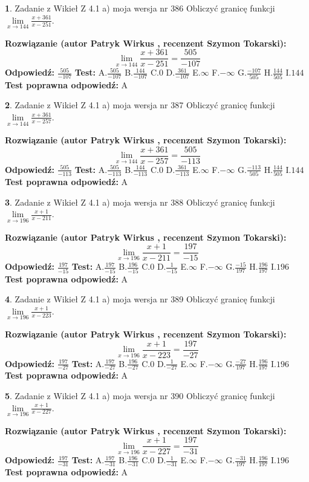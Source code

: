 \documentclass[12pt, a4paper]{article}
\theoremstyle{definition} %
\newtheorem{zad}{}
\newcommand{\zadStart}[1]{\begin{zad}#1\newline}
\newcommand{\zadStop}{\end{zad}}
\newcommand{\rozwStart}[2]{\noindent \textbf{Rozwiązanie (autor #1 , recenzent #2): }\newline}
\newcommand{\rozwStop}{\newline}
\newcommand{\odpStart}{\noindent \textbf{Odpowiedź:}\newline}
\newcommand{\odpStop}{\newline}
\newcommand{\testStart}{\noindent \textbf{Test:}\newline}
\newcommand{\testStop}{\newline}
\newcommand{\kluczStart}{\noindent \textbf{Test poprawna odpowiedź:}\newline}
\newcommand{\kluczStop}{\newline}
\begin{document}
\zadStart{Zadanie z Wikieł Z 4.1 a) moja wersja nr 386}
Obliczyć granicę funkcji $\lim\limits_{x\to144}\frac{x+361}{x-251}$.
\zadStop
\rozwStart{Patryk Wirkus}{Szymon Tokarski}
$$\lim\limits_{x\to144}\frac{x+361}{x-251} = \frac{505}{-107}$$
\rozwStop
\odpStart
$\frac{505}{-107}$
\odpStop
\testStart
A.$\frac{505}{-107}$
B.$\frac{144}{-107}$
C.$0$
D.$\frac{361}{-107}$
E.$\infty$
F.$-\infty$
G.$\frac{-107}{505}$
H.$\frac{144}{505}$
I.$144$
\testStop
\kluczStart
A
\kluczStop



\zadStart{Zadanie z Wikieł Z 4.1 a) moja wersja nr 387}
Obliczyć granicę funkcji $\lim\limits_{x\to144}\frac{x+361}{x-257}$.
\zadStop
\rozwStart{Patryk Wirkus}{Szymon Tokarski}
$$\lim\limits_{x\to144}\frac{x+361}{x-257} = \frac{505}{-113}$$
\rozwStop
\odpStart
$\frac{505}{-113}$
\odpStop
\testStart
A.$\frac{505}{-113}$
B.$\frac{144}{-113}$
C.$0$
D.$\frac{361}{-113}$
E.$\infty$
F.$-\infty$
G.$\frac{-113}{505}$
H.$\frac{144}{505}$
I.$144$
\testStop
\kluczStart
A
\kluczStop



\zadStart{Zadanie z Wikieł Z 4.1 a) moja wersja nr 388}
Obliczyć granicę funkcji $\lim\limits_{x\to196}\frac{x+1}{x-211}$.
\zadStop
\rozwStart{Patryk Wirkus}{Szymon Tokarski}
$$\lim\limits_{x\to196}\frac{x+1}{x-211} = \frac{197}{-15}$$
\rozwStop
\odpStart
$\frac{197}{-15}$
\odpStop
\testStart
A.$\frac{197}{-15}$
B.$\frac{196}{-15}$
C.$0$
D.$\frac{1}{-15}$
E.$\infty$
F.$-\infty$
G.$\frac{-15}{197}$
H.$\frac{196}{197}$
I.$196$
\testStop
\kluczStart
A
\kluczStop



\zadStart{Zadanie z Wikieł Z 4.1 a) moja wersja nr 389}
Obliczyć granicę funkcji $\lim\limits_{x\to196}\frac{x+1}{x-223}$.
\zadStop
\rozwStart{Patryk Wirkus}{Szymon Tokarski}
$$\lim\limits_{x\to196}\frac{x+1}{x-223} = \frac{197}{-27}$$
\rozwStop
\odpStart
$\frac{197}{-27}$
\odpStop
\testStart
A.$\frac{197}{-27}$
B.$\frac{196}{-27}$
C.$0$
D.$\frac{1}{-27}$
E.$\infty$
F.$-\infty$
G.$\frac{-27}{197}$
H.$\frac{196}{197}$
I.$196$
\testStop
\kluczStart
A
\kluczStop



\zadStart{Zadanie z Wikieł Z 4.1 a) moja wersja nr 390}
Obliczyć granicę funkcji $\lim\limits_{x\to196}\frac{x+1}{x-227}$.
\zadStop
\rozwStart{Patryk Wirkus}{Szymon Tokarski}
$$\lim\limits_{x\to196}\frac{x+1}{x-227} = \frac{197}{-31}$$
\rozwStop
\odpStart
$\frac{197}{-31}$
\odpStop
\testStart
A.$\frac{197}{-31}$
B.$\frac{196}{-31}$
C.$0$
D.$\frac{1}{-31}$
E.$\infty$
F.$-\infty$
G.$\frac{-31}{197}$
H.$\frac{196}{197}$
I.$196$
\testStop
\kluczStart
A
\kluczStop
\end{document}
